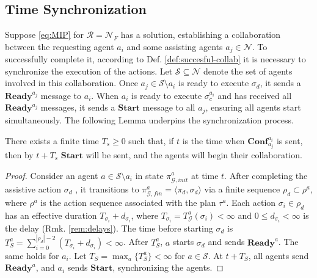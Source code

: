 \subsection{Time Synchronization}\label{subsec:res-synchro}
Suppose \eqref{eq:MIP} for $\mathcal{R}=\mathcal{N}_F$ has a solution, establishing a collaboration between the requesting agent $a_i$ and some assisting agents $a_j\in\mathcal{N}$. To successfully complete it, according to Def. \ref{def:succesful-collab} it is necessary to synchronize the execution of the actions. Let $\mathcal{S} \subseteq \mathcal{N}$ denote the set of agents involved in this collaboration. Once $a_j \in \mathcal{S} \setminus a_i$ is ready to execute $\sigma_d$, it sends a $\mathbf{Ready}^{a_j}$ message to $a_i$. When $a_i$ is ready to execute $\sigma^{a_i}_c$ and has received all $\mathbf{Ready}^{a_j}$ messages, it sends a $\mathbf{Start}$ message to all $a_j$, ensuring all agents start simultaneously. The following Lemma underpins the synchronization process.
\begin{lemma}\label{lemma:collaboration}
    There exists a finite time $T_s \geq 0$ such that, if $t$ is the time when $\mathbf{Conf}^{a_i}_{a_j}$ is sent, then by $t + T_s$ $\mathbf{Start}$ will be sent, and the agents will begin their collaboration.
\end{lemma}
\begin{proof}
    Consider an agent $a \in \mathcal{S} \setminus a_i$ in state  $\pi^{a}_{\mathcal{G}, init}$ at time $t$. After completing the assistive action $\sigma_d$ , it transitions to  $\pi^{a}_{\mathcal{G}, fin} = \langle \pi_d, \sigma_d \rangle$  via a finite sequence $\rho_d \subset \rho^a$, where  $\rho^a$ is the action sequence associated with the plan $\tau^a$. Each action $ \sigma_i \in \rho_d $ has an effective duration $ T_{\sigma_i} + d_{\sigma_i} $, where $ T_{\sigma_i} = T^{a}_{\mathcal{G}}(\sigma_i) < \infty $ and $ 0\leq d_{\sigma_i}<\infty $ is the delay (Rmk. \ref{rem:delays}).
    The time before starting $ \sigma_d $ is $ T^{a}_S = \sum_{i=0}^{|\rho_d| - 2} (T_{\sigma_i} + d_{\sigma_i}) < \infty $. After $ T^{a}_S $, $ a $ starts $ \sigma_d $ and sends $ \mathbf{Ready}^{a} $. The same holds for $ a_i $.
    Let $ T_S = \max_a \{T^{a}_S\} < \infty $ for $ a \in \mathcal{S} $. At $ t + T_S $, all agents send $ \mathbf{Ready}^{a} $, and $ a_i $ sends $\mathbf{Start}$, synchronizing the agents.
\end{proof}

